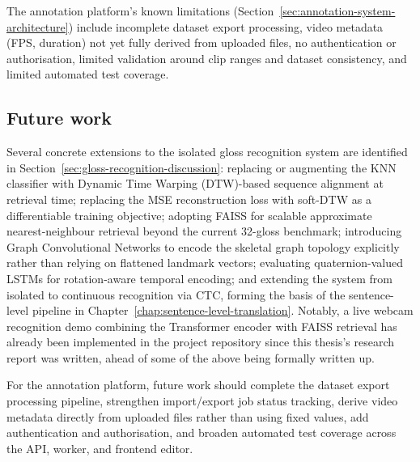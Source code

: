 The annotation platform's known limitations
(Section~\ref{sec:annotation-system-architecture}) include incomplete dataset
export processing, video metadata (FPS, duration) not yet fully derived from
uploaded files, no authentication or authorisation, limited validation around
clip ranges and dataset consistency, and limited automated test coverage.


\subsection{Future work}
\label{sec:conclusions-future-work}

Several concrete extensions to the isolated gloss recognition system are
identified in Section~\ref{sec:gloss-recognition-discussion}: replacing or
augmenting the KNN classifier with Dynamic Time Warping (DTW)-based sequence
alignment at retrieval time; replacing the MSE reconstruction loss with
soft-DTW as a differentiable training objective; adopting FAISS for scalable
approximate nearest-neighbour retrieval beyond the current 32-gloss benchmark;
introducing Graph Convolutional Networks to encode the skeletal graph topology
explicitly rather than relying on flattened landmark vectors; evaluating
quaternion-valued LSTMs for rotation-aware temporal encoding; and extending the
system from isolated to continuous recognition via CTC, forming the basis of
the sentence-level pipeline in Chapter~\ref{chap:sentence-level-translation}.
Notably, a live webcam recognition demo combining the Transformer encoder with
FAISS retrieval has already been implemented in the project repository since
this thesis's research report was written, ahead of some of the above being
formally written up.

For the annotation platform, future work should complete the dataset export
processing pipeline, strengthen import/export job status tracking, derive video
metadata directly from uploaded files rather than using fixed values, add
authentication and authorisation, and broaden automated test coverage across
the API, worker, and frontend editor.

